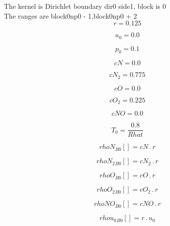 \documentclass{article}
\begin{document}
\noindent The kernel is Dirichlet boundary dir0 side1, block is 0\\\noindent The ranges are block0np0 - 1,block0np0 + 2\\\begin{dmath}r = 0.125\end{dmath}

\begin{dmath}u_{0} = 0.0\end{dmath}

\begin{dmath}p_{0} = 0.1\end{dmath}

\begin{dmath}cN = 0.0\end{dmath}

\begin{dmath}cN_{2} = 0.775\end{dmath}

\begin{dmath}cO = 0.0\end{dmath}

\begin{dmath}cO_{2} = 0.225\end{dmath}

\begin{dmath}cNO = 0.0\end{dmath}

\begin{dmath}T_{0} = \frac{0.8}{Rhat}\end{dmath}

\begin{dmath}{rhoN{_{B0}}}[{}] = cN \,.\, r\end{dmath}

\begin{dmath}{rhoN_{2}{_{B0}}}[{}] = cN_{2} \,.\, r\end{dmath}

\begin{dmath}{rhoO{_{B0}}}[{}] = cO \,.\, r\end{dmath}

\begin{dmath}{rhoO_{2}{_{B0}}}[{}] = cO_{2} \,.\, r\end{dmath}

\begin{dmath}{rhoNO{_{B0}}}[{}] = cNO \,.\, r\end{dmath}

\begin{dmath}{rhou_{0}{_{B0}}}[{}] = r \,.\, u_{0}\end{dmath}
\end{document}
